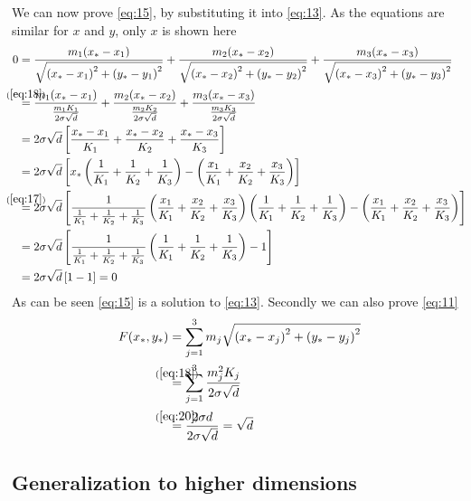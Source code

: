 We can now prove \cref{eq:15}, by substituting it into \cref{eq:13}. As the
equations are similar for $x$ and $y$, only $x$ is shown here
%
\begin{align}
  0
  &= \frac{m_1 (x_\ast - x_1)}{\sqrt{{(x_\ast - x_1)}^2 + {(y_\ast - y_1)}^2}} +
    \frac{m_2 (x_\ast - x_2)}{\sqrt{{(x_\ast - x_2)}^2 + {(y_\ast - y_2)}^2}} +
    \frac{m_3 (x_\ast - x_3)}{\sqrt{{(x_\ast - x_3)}^2 + {(y_\ast - y_3)}^2}} \\
  &\stackrel{\mathclap{(\ref{eq:18})}}=
    \frac{m_1 (x_\ast - x_1)}{\frac{m_1 K_1}{2 \sigma \sqrt{d}}} +
    \frac{m_2 (x_\ast - x_2)}{\frac{m_2 K_2}{2 \sigma \sqrt{d}}} +
    \frac{m_3 (x_\ast - x_3)}{\frac{m_3 K_3}{2 \sigma \sqrt{d}}} \\
  &= 2 \sigma \sqrt{d} \left[
    \frac{x_\ast - x_1}{K_1} +
    \frac{x_\ast - x_2}{K_2} +
    \frac{x_\ast - x_3}{K_3} \right] \\
  &= 2 \sigma \sqrt{d} \left[
    x_\ast \left( \frac{1}{K_1} + \frac{1}{K_2} + \frac{1}{K_3} \right) -
    \left( \frac{x_1}{K_1} + \frac{x_2}{K_2} + \frac{x_3}{K_3} \right)
    \right] \\
  &\stackrel{\mathclap{(\ref{eq:17})}}=
    2 \sigma \sqrt{d} \left[
    \frac{1}{\frac{1}{K_1} + \frac{1}{K_2} + \frac{1}{K_3}} \left( \frac{x_1}{K_1} +
    \frac{x_2}{K_2} + \frac{x_3}{K_3} \right)
    \left( \frac{1}{K_1} + \frac{1}{K_2} + \frac{1}{K_3} \right) -
    \left( \frac{x_1}{K_1} + \frac{x_2}{K_2} + \frac{x_3}{K_3} \right)
    \right] \\
  &= 2 \sigma \sqrt{d} \left[
    \frac{1}{\frac{1}{K_1} + \frac{1}{K_2} + \frac{1}{K_3}}
    \left( \frac{1}{K_1} + \frac{1}{K_2} + \frac{1}{K_3} \right) -
    1 \right] \\
  &= 2 \sigma \sqrt{d} \left[ 1 - 1 \right] = 0
\end{align}
%
As can be seen \cref{eq:15} is a solution to \cref{eq:13}. Secondly we can also
prove \cref{eq:11}
%
\begin{align}
  F(x_\ast,y_\ast)
  &= \sum_{j=1}^3 m_j \sqrt{{(x_\ast - x_j)}^2 + {(y_\ast - y_j)}^2} \\
  &\stackrel{\mathclap{(\ref{eq:18})}}{=}
    \sum_{j=1}^3 \frac{m_j^2 K_j}{2 \sigma \sqrt{d}} \\
  &\stackrel{\mathclap{(\ref{eq:20})}}{=}
    \frac{2 \sigma d}{2 \sigma \sqrt{d}} = \sqrt{d}
\end{align}

\subsection{Generalization to higher dimensions}
\label{sec:gener-high-dimens}

